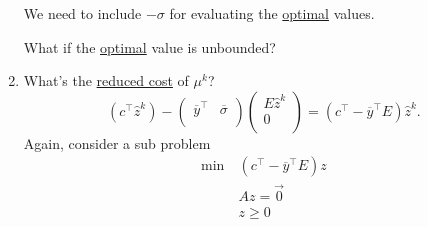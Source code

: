 \begin{prev}
\begin{enumerate}
		      \begin{note}
			      We need to include \(-\sigma\) for evaluating the \hyperref[def:optimal-solution]{optimal} values.
		      \end{note}

		      \begin{problem}
		      What if the \hyperref[def:optimal-solution]{optimal} value is unbounded?
		      \end{problem}
		\item What's the \hyperref[def:reduced-cost]{reduced cost} of \(\mu^k\)?
		      \[
			      (c^{\top}\hat{z}^k) - \begin{pmatrix}
				      \overline{y}^{\top} & \overline{\sigma} \\
			      \end{pmatrix}\begin{pmatrix}
				      E \hat{z}^k \\
				      0           \\
			      \end{pmatrix} =  (c^{\top} - \overline{y}^{\top}E)\hat{z}^k.
		      \]
		      Again, consider a sub problem
		      \[
			      \begin{aligned}
				      \min~ & (c^{\top} - \overline{y}^{\top}E)z \\
				            & Az = \vec{0}                       \\
				            & z\geq 0
			      \end{aligned}
		      \]


\end{enumerate}
\end{prev}
